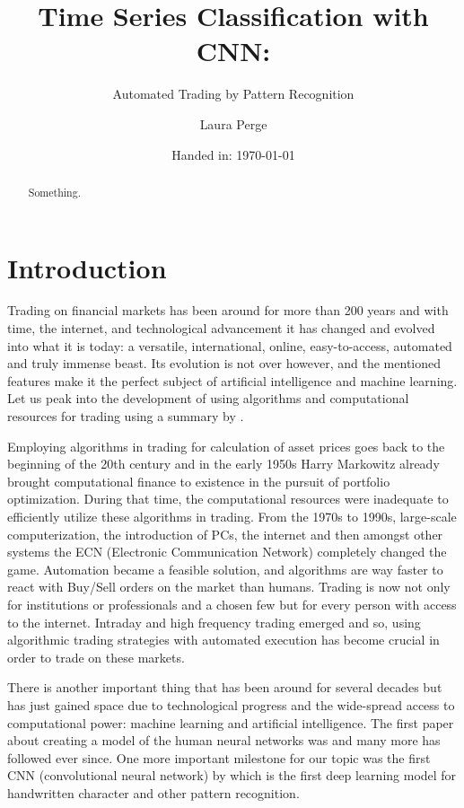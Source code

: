 \documentclass[11pt, a4paper]{article}
\author{Laura Perge}
\title{Time Series Classification with CNN:}
\subtitle{ Automated Trading by Pattern Recognition}
\date{Handed in: \today}
\begin{document}
\maketitle

\tableofcontents

\begin{abstract}
    Something.
\end{abstract}

\section{Introduction}
Trading on financial markets has been around for more than 200 years and with time, the internet, and technological advancement it has changed and evolved into what it is today:  
a versatile, international, online, easy-to-access, automated and truly immense beast. Its evolution is not over however, and the mentioned features make it the perfect subject 
of artificial intelligence and machine learning. Let us peak into the development of using algorithms and computational resources for trading using a summary by \cite{rialtohistory}. 

Employing algorithms in trading for calculation of asset prices goes back to the beginning of the 20th century and in the early 1950s Harry Markowitz already brought computational finance 
to existence in the pursuit of portfolio optimization. During that time, the computational resources were inadequate to efficiently utilize these algorithms in trading. From the 1970s to 1990s, 
large-scale computerization, the introduction of PCs, the internet and then amongst other systems the ECN (Electronic Communication Network) completely changed the game. Automation became a 
feasible solution, and algorithms are way faster to react with Buy/Sell orders on the market than humans. Trading is now not only for institutions or professionals and a chosen few but 
for every person with access to the internet. Intraday and high frequency trading emerged and so, using algorithmic trading strategies with automated execution has become crucial 
in order to trade on these markets. 

There is another important thing that has been around for several decades but has just gained space due to technological progress and the wide-spread access to computational 
power: machine learning and artificial intelligence. The first paper about creating a model of the human neural networks was \cite{mcculloch1943logical} and many more has followed ever since. 
One more important milestone for our topic was the first CNN (convolutional neural network) by \cite{fukushima1979neural} which is the first deep learning model for handwritten character and other 
pattern recognition.
\end{document}
